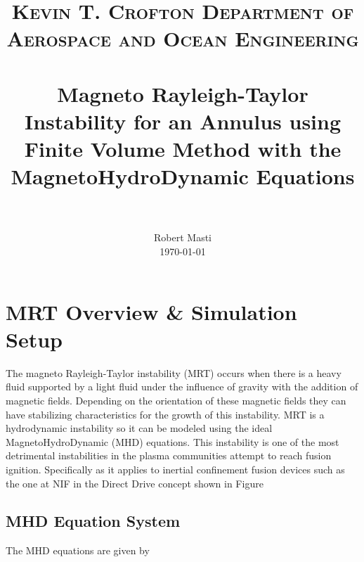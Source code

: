 \documentclass[paper=a4, fontsize=11pt]{scrartcl}
\title{%
    \usefont{OT1}{bch}{b}{n}
    \normalfont\normalsize \textsc{Kevin T. Crofton Department of Aerospace and Ocean Engineering} \\ [25pt]
    \horrule{0.5pt} \\[0.4cm]
    \huge Magneto Rayleigh-Taylor Instability for an Annulus using Finite Volume Method with the MagnetoHydroDynamic Equations  \\
    \horrule{2pt} \\[0.5cm]}
\author{\normalfont\normalsize
  Robert Masti\\[-3pt]  
  \normalsize\today}
\date{}
\numberwithin{equation}{section}                %
\numberwithin{figure}{section}                  %
\numberwithin{table}{section}                           %
\begin{document}
\maketitle
\section{MRT Overview \& Simulation Setup}\label{sec:ovrvw}
The magneto Rayleigh-Taylor instability (MRT) occurs when there is a heavy fluid supported by a light fluid under the influence of gravity with the addition of magnetic fields. Depending on the orientation of these magnetic fields they can have stabilizing characteristics for the growth of this instability. MRT is a hydrodynamic instability so it can be modeled using the ideal MagnetoHydroDynamic (MHD) equations. This instability is one of the most detrimental instabilities in the plasma communities attempt to reach fusion ignition. Specifically as it applies to inertial confinement fusion devices such as the one at NIF in the Direct Drive concept shown in Figure


 
 



\subsection{MHD Equation System}

The MHD equations are given by
\end{document}
